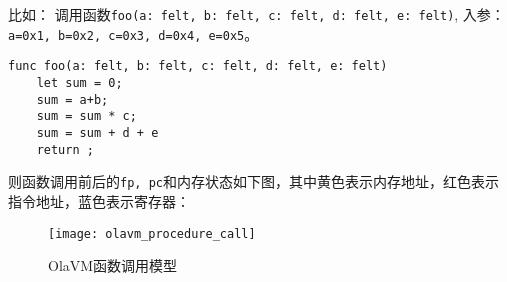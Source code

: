 比如： 调用函数\texttt{foo(a: felt, b: felt, c: felt, d: felt, e: felt)}, 入参：\texttt{a=0x1, b=0x2, c=0x3, d=0x4, e=0x5}。
\begin{lstlisting}[label={lst:function_call}]
func foo(a: felt, b: felt, c: felt, d: felt, e: felt)
    let sum = 0;
    sum = a+b;
    sum = sum * c;
    sum = sum + d + e
    return ;
\end{lstlisting}

则函数调用前后的\texttt{fp, pc}和内存状态如下图，其中黄色表示内存地址，红色表示指令地址，蓝色表示寄存器：
\begin{figure}[!htp]
    \centering
    \texttt{[image: olavm\_procedure\_call]}
    \caption{OlaVM函数调用模型}
    \label{fig:processor call}
\end{figure}


